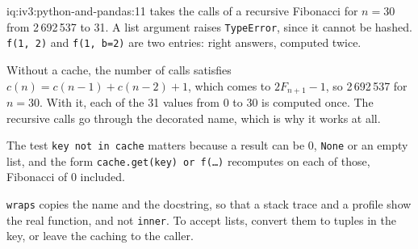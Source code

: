 \begin{solution}{iq:iv3:python-and-pandas:11}
 takes the calls of a recursive Fibonacci for $n = 30$ from 2\,692\,537 to 31. A list argument raises \texttt{TypeError}, since it cannot be hashed. \texttt{f(1, 2)} and \texttt{f(1, b=2)} are two entries: right answers, computed twice.
\label{lst:iv3:pp:memo}

Without a cache, the number of calls satisfies $c(n) = c(n - 1) + c(n - 2) + 1$, which comes to $2F_{n+1} - 1$, so 2\,692\,537 for $n = 30$. With it, each of the 31 values from 0 to 30 is computed once. The recursive calls go through the decorated name, which is why it works at all.

The test \texttt{key not in cache} matters because a result can be 0, \texttt{None} or an empty list, and the form \texttt{cache.get(key) or f(\dots)} recomputes on each of those, Fibonacci of 0 included.

\texttt{wraps} copies the name and the docstring, so that a stack trace and a profile show the real function, and not \texttt{inner}. To accept lists, convert them to tuples in the key, or leave the caching to the caller.

\end{solution}


